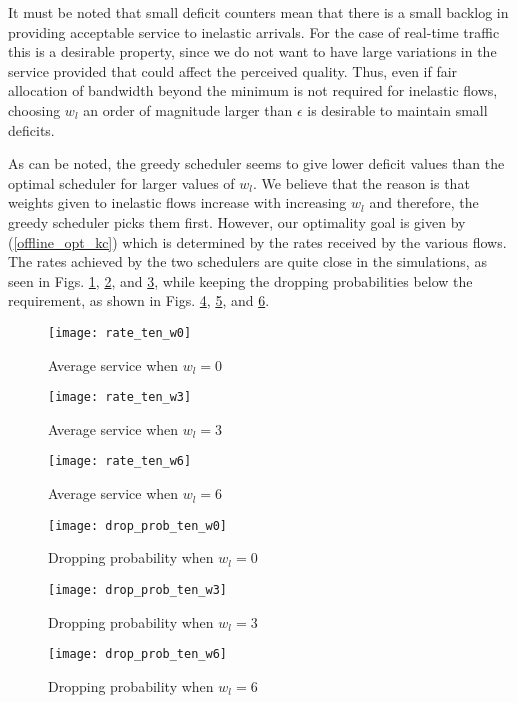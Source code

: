 \documentclass[conference]{IEEEtran}
\begin{document}
It must be noted that small deficit counters mean that there is a small backlog in providing acceptable service to inelastic arrivals. For the case of real-time traffic this is a desirable property, since we do not want to have large variations in the service provided that could affect the perceived quality. Thus, even if fair allocation of bandwidth beyond the minimum is not required for inelastic flows, choosing $w_l$ an order of magnitude larger than $\epsilon$ is desirable to maintain small deficits.

As can be noted, the greedy scheduler seems to give lower deficit values than the optimal scheduler for larger values of $w_l$. We believe that the reason is that weights given to inelastic flows increase with increasing $w_l$ and therefore, the greedy scheduler picks them first. However, our optimality goal is given by (\ref{offline_opt_kc}) which is determined by the rates received by the various flows. The rates achieved by the two schedulers are quite close in the simulations, as seen in Figs. \ref{rate_ten_w0}, \ref{rate_ten_w3}, and \ref{rate_ten_w6}, while keeping the dropping probabilities below the requirement, as shown in Figs. \ref{drop_prob_ten_w0}, \ref{drop_prob_ten_w3}, and \ref{drop_prob_ten_w6}.

\begin{figure}[t]
	\centering
	\texttt{[image: rate\_ten\_w0]}
	\caption{Average service when $w_l=0$}
	\label{rate_ten_w0}
\end{figure}
\begin{figure}[t]
	\centering
	\texttt{[image: rate\_ten\_w3]}
	\caption{Average service when $w_l=3$}
	\label{rate_ten_w3}
\end{figure}
\begin{figure}[t]
	\centering
	\texttt{[image: rate\_ten\_w6]}
	\caption{Average service when $w_l=6$}
	\label{rate_ten_w6}
\end{figure}

\begin{figure}[t]
	\centering
	\texttt{[image: drop\_prob\_ten\_w0]}
	\caption{Dropping probability when $w_l=0$}
	\label{drop_prob_ten_w0}
\end{figure}
\begin{figure}[t]
	\centering
	\texttt{[image: drop\_prob\_ten\_w3]}
	\caption{Dropping probability when $w_l=3$}
	\label{drop_prob_ten_w3}
\end{figure}
\begin{figure}[t]
	\centering
	\texttt{[image: drop\_prob\_ten\_w6]}
	\caption{Dropping probability when $w_l=6$}
	\label{drop_prob_ten_w6}
\end{figure}
\end{document}
